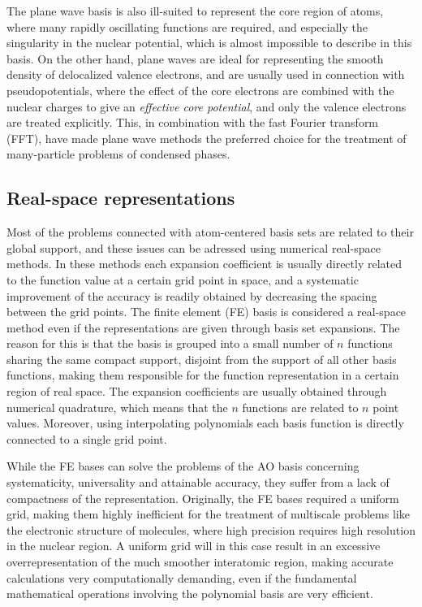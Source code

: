 The plane wave basis is also ill-suited to represent the core region of atoms, 
where many rapidly oscillating functions are required, and especially the 
singularity in the nuclear potential, which is almost impossible to describe 
in this basis. On the other hand, plane waves are ideal for representing the 
smooth density of delocalized valence electrons, and are usually used in 
connection with pseudopotentials\cite{Vanderbilt:1990}, where the effect of 
the core electrons are combined with the nuclear charges to give an 
\emph{effective core potential}, and only the valence electrons are treated 
explicitly. This, in combination with the fast Fourier transform (FFT), have 
made plane wave methods the preferred choice for the treatment of many-particle 
problems of condensed phases. 

\subsection{Real-space representations}
Most of the problems connected with atom-centered basis sets are related to their 
global support, and these issues can be adressed using numerical real-space methods. 
In these methods each expansion coefficient is usually directly related to the 
function value at a certain grid point in space, and a systematic improvement of 
the accuracy is readily obtained by decreasing the spacing between the grid points. 
The finite element (FE) basis is considered a real-space method even if the 
representations are given through basis set expansions. The reason for this is 
that the basis is grouped into a small number of $n$ functions sharing the same 
compact support, disjoint from the support of all other basis functions, making 
them responsible for the function representation in a certain region of real space.
The expansion coefficients are usually obtained through numerical quadrature, which 
means that the $n$ functions are related to $n$ point values. Moreover, using 
interpolating polynomials each basis function is directly connected to a single grid 
point.

While the FE bases can solve the problems of the AO basis concerning systematicity, 
universality and attainable accuracy, they suffer from a lack of 
compactness of the representation. Originally, the FE bases required a uniform 
grid, making them highly inefficient for the treatment of multiscale problems 
like the electronic structure of molecules, where high precision requires high 
resolution in the nuclear region. A uniform grid will in this case result in an 
excessive overrepresentation of the much smoother interatomic region, making 
accurate calculations very computationally demanding, even if the fundamental 
mathematical operations involving the polynomial basis are very efficient. 

